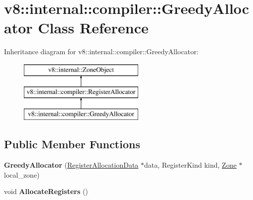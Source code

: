 \hypertarget{classv8_1_1internal_1_1compiler_1_1_greedy_allocator}{}\section{v8\+:\+:internal\+:\+:compiler\+:\+:Greedy\+Allocator Class Reference}
\label{classv8_1_1internal_1_1compiler_1_1_greedy_allocator}
Inheritance diagram for v8\+:\+:internal\+:\+:compiler\+:\+:Greedy\+Allocator\+:\begin{figure}[H]
\begin{center}
\leavevmode
\includegraphics[height=3.000000cm]{classv8_1_1internal_1_1compiler_1_1_greedy_allocator}
\end{center}
\end{figure}
\subsection*{Public Member Functions}
\begin{DoxyCompactItemize}
\item 
{\bfseries Greedy\+Allocator} (\hyperlink{classv8_1_1internal_1_1compiler_1_1_register_allocation_data}{Register\+Allocation\+Data} $\ast$data, Register\+Kind kind, \hyperlink{classv8_1_1internal_1_1_zone}{Zone} $\ast$local\+\_\+zone)\hypertarget{classv8_1_1internal_1_1compiler_1_1_greedy_allocator_a9ae64cea398585f95fad156f3fce6bd2}{}\label{classv8_1_1internal_1_1compiler_1_1_greedy_allocator_a9ae64cea398585f95fad156f3fce6bd2}

\item 
void {\bfseries Allocate\+Registers} ()\hypertarget{classv8_1_1internal_1_1compiler_1_1_greedy_allocator_a455a06edea6619d5a7cb945276917de5}{}\label{classv8_1_1internal_1_1compiler_1_1_greedy_allocator_a455a06edea6619d5a7cb945276917de5}

\end{DoxyCompactItemize}
